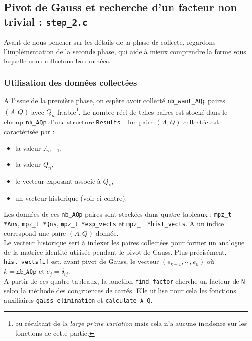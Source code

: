 \subsection{Pivot de Gauss et recherche d'un facteur non trivial
            : \texttt{step\_2.c}}

Avant de nous pencher sur les détails de la phase de collecte, regardons 
l'implémentation de la seconde phase, qui aide à mieux comprendre la 
forme sous laquelle nous collectons les données.

\subsubsection{Utilisation des données collectées}
A l'issue de la première
phase, on espère avoir collecté \texttt{nb\_want\_AQp} paires $(A,Q)$ avec
$Q_n$ friable\footnote{ou résultant de la \textit{large prime variation} mais 
cela n'a aucune incidence sur les fonctions de cette partie.}. Le nombre
réel de telles paires est stocké dans le champ \texttt{nb\_AQp} d'une structure
\texttt{Results}. Une paire $(A,Q)$ collectée est caractérisée par :

\begin{itemize}
    \item la valeur $A_{n-1}$,
    \item la valeur $Q_n$,
    \item le vecteur exposant associé à $Q_n$,
    \item un vecteur historique (voir ci-contre).
\end{itemize}
Les données de ces \texttt{nb\_AQp} paires sont stockées dans
quatre tableaux : \texttt{mpz\_t *Ans}, \texttt{mpz\_t *Qns}, 
\texttt{mpz\_t *exp\_vects} et \texttt{mpz\_t *hist\_vects}.
A un indice correspond une paire $(A,Q)$ donnée. \\

Le vecteur historique sert à indexer les paires collectées pour former
un analogue de la matrice identité utilisée pendant le pivot de Gauss. 
Plus précisément, \texttt{hist\_vects[i]} est, avant pivot de Gauss, le
vecteur $(e_{k-1}, \cdots, e_0)$ où $k=\texttt{nb\_AQp}$ et $e_j = 
\delta_{ij}$.\\ 

A partir de ces quatre tableaux, la fonction \texttt{find\_factor} cherche 
un facteur de \texttt{N} selon la méthode des congruences de carrés. Elle
utilise pour cela les fonctions auxiliaires \texttt{gauss\_elimination} et
\texttt{calculate\_A\_Q}. 

